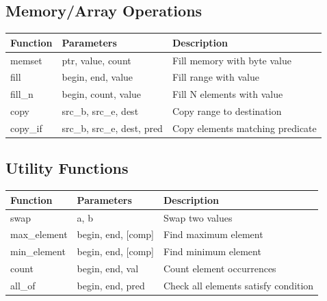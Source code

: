 \documentclass[10pt]{article}
\begin{document}
\begin{multicols*}{2}
\subsection*{Memory/Array Operations}
\begin{tabularx}{\linewidth}{|l|l|X|}
    \hline
    \textbf{Function} & \textbf{Parameters} & \textbf{Description} \\
    \hline
    memset & ptr, value, count & Fill memory with byte value \\
    \hline
    fill & begin, end, value & Fill range with value \\
    \hline
    fill\_n & begin, count, value & Fill N elements with value \\
    \hline
    copy & src\_b, src\_e, dest & Copy range to destination \\
    \hline
    copy\_if & src\_b, src\_e, dest, pred & Copy elements matching predicate \\
    \hline
\end{tabularx}

\subsection*{Utility Functions}
\begin{tabularx}{\linewidth}{|l|l|X|}
    \hline
    \textbf{Function} & \textbf{Parameters} & \textbf{Description} \\
    \hline
    swap & a, b & Swap two values \\
    \hline
    max\_element & begin, end, [comp] & Find maximum element \\
    \hline
    min\_element & begin, end, [comp] & Find minimum element \\
    \hline
    count & begin, end, val & Count element occurrences \\
    \hline
    all\_of & begin, end, pred & Check all elements satisfy condition \\
    \hline
\end{tabularx}


\end{multicols*}
\end{document}
